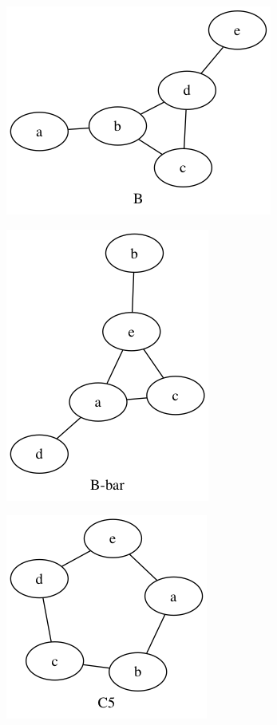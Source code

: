 \begin{enumerate}[(a)]
        \begin{figure}[H]
        \centering
        \includegraphics[scale=0.5]{118/2.png}
        \end{figure}

        \begin{figure}[H]
        \centering
        \includegraphics[scale=0.5]{118/2i.png}
        \end{figure}

        \begin{figure}[H]
        \centering
        \includegraphics[scale=0.5]{118/3.png}
        \end{figure}


\end{enumerate}
